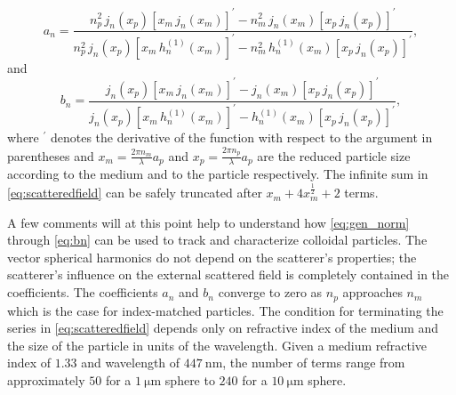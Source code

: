 \begin{equation}
  \label{eq:an}
  a_n = \frac{n_p^2 \, j_n(x_p) \left[x_m \, j_n(x_m)\right]^\prime -
    n_m^2 \, j_n(x_m) \left[x_p \, j_n(x_p)\right]^\prime}{
    n_p^2 \, j_n(x_p) \left[x_m \, h^{(1)}_n(x_m)\right]^\prime -
    n_m^2 \, h^{(1)}_n(x_m) \left[x_p \, j_n(x_p)\right]^\prime},
\end{equation}
and
\begin{equation}
\label{eq:bn}
  b_n = \frac{j_n(x_p) \left[x_m \, j_n(x_m)\right]^\prime -
    j_n(x_m) \left[x_p \, j_n(x_p)\right]^\prime}{
    j_n(x_p) \left[x_m \, h^{(1)}_n(x_m)\right]^\prime -
    h^{(1)}_n(x_m) \left[x_p \, j_n(x_p)\right]^\prime},
\end{equation}
where $^\prime$ denotes the derivative of the function with respect
to the argument in parentheses and $x_m = \frac{2\pi n_m}{\lambda} a_p$
and $x_p = \frac{2\pi n_p}{\lambda} a_p$ are the reduced particle size according
to the medium and to the particle respectively. The infinite
sum in \eqref{eq:scatteredfield} can be safely truncated after
$x_m + 4x_m^{\frac{1}{2}} + 2$ terms\cite{wiscombe80}.

A few comments will at this point help to understand how \eqref{eq:gen_norm} through
\eqref{eq:bn} can be used to track and characterize colloidal particles.
The vector spherical harmonics do not depend on the scatterer's properties;
the scatterer's influence on the external scattered field is completely contained
in the coefficients.
The coefficients $a_n$ and $b_n$ converge to zero as $n_p$ approaches $n_m$ which
is the case for index-matched particles.
The condition for terminating the series in \eqref{eq:scatteredfield} depends only on refractive
index of the medium and the size of the particle in units of the wavelength. Given a medium
refractive index of $1.33$ and wavelength of $\SI{447}{\nm}$, the number of terms range from
approximately $50$ for a $\SI{1}{\um}$ sphere to $\num{240}$ for a $\SI{10}{\um}$ sphere.


